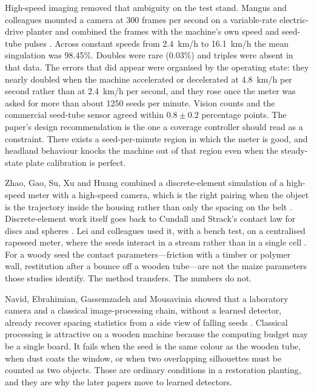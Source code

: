 High-speed imaging removed that ambiguity on the test stand. Mangus and colleagues mounted a camera at \num{300} frames per second on a variable-rate electric-drive planter and combined the frames with the machine's own speed and seed-tube pulses \cite{mangus2017}. Across constant speeds from \SI{2.4}{km/h} to \SI{16.1}{km/h} the mean singulation was \num{98.45}\%. Doubles were rare (\num{0.03}\%) and triples were absent in that data. The errors that did appear were organised by the operating state: they nearly doubled when the machine accelerated or decelerated at \SI{4.8}{km/h} per second rather than at \SI{2.4}{km/h} per second, and they rose once the meter was asked for more than about \num{1250} seeds per minute. Vision counts and the commercial seed-tube sensor agreed within \(0.8\pm 0.2\) percentage points. The paper's design recommendation is the one a coverage controller should read as a constraint. There exists a seed-per-minute region in which the meter is good, and headland behaviour knocks the machine out of that region even when the steady-state plate calibration is perfect.

Zhao, Gao, Su, Xu and Huang combined a discrete-element simulation of a high-speed meter with a high-speed camera, which is the right pairing when the object is the trajectory inside the housing rather than only the spacing on the belt \cite{zhao2024hs}. Discrete-element work itself goes back to Cundall and Strack's contact law for discs and spheres \cite{cundall1979}. Lei and colleagues used it, with a bench test, on a centralised rapeseed meter, where the seeds interact in a stream rather than in a single cell \cite{lei2021}. For a woody seed the contact parameters---friction with a timber or polymer wall, restitution after a bounce off a wooden tube---are not the maize parameters those studies identify. The method transfers. The numbers do not.

Navid, Ebrahimian, Gassemzadeh and Mousavinia showed that a laboratory camera and a classical image-processing chain, without a learned detector, already recover spacing statistics from a side view of falling seeds \cite{navid2011}. Classical processing is attractive on a wooden machine because the computing budget may be a single board. It fails when the seed is the same colour as the wooden tube, when dust coats the window, or when two overlapping silhouettes must be counted as two objects. Those are ordinary conditions in a restoration planting, and they are why the later papers move to learned detectors.

